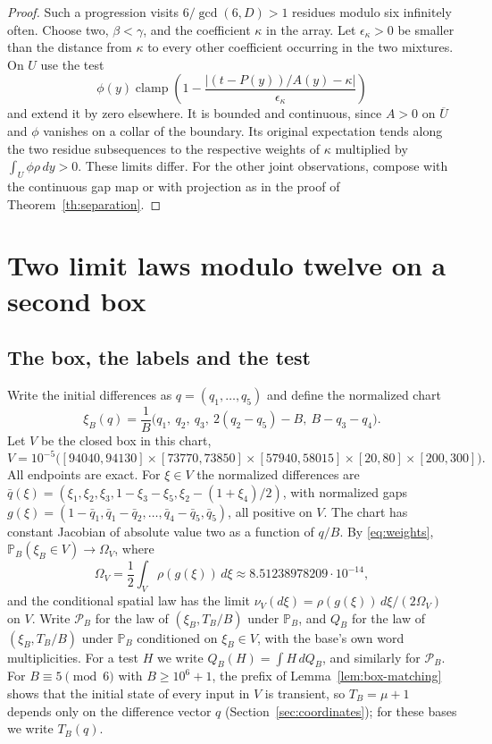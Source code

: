 \documentclass[11pt,reqno]{amsart}
\theoremstyle{remark}
\newcommand{\clamp}{\operatorname{clamp}}
\newcommand{\Prob}{\mathbb P}
\begin{document}
\begin{proof}
Such a progression visits \(6/\gcd(6,D)>1\) residues modulo six infinitely often. Choose two, \(\beta<\gamma\), and the coefficient \(\kappa\) in the array. Let \(\epsilon_\kappa>0\) be smaller than the distance from \(\kappa\) to every other coefficient occurring in the two mixtures. On \(U\) use the test
\[
 \phi(y)\clamp\!\left(1-\frac{|(t-P(y))/A(y)-\kappa|}{\epsilon_\kappa}\right)
\]
and extend it by zero elsewhere. It is bounded and continuous, since \(A>0\) on \(\overline U\) and \(\phi\) vanishes on a collar of the boundary. Its original expectation tends along the two residue subsequences to the respective weights of \(\kappa\) multiplied by \(\int_U\phi\rho\,dy>0\). These limits differ. For the other joint observations, compose with the continuous gap map or with projection as in the proof of Theorem~\ref{th:separation}.
\end{proof}

\section{Two limit laws modulo twelve on a second box}\label{sec:box}

\subsection{The box, the labels and the test}
Write the initial differences as \(q=(q_1,\ldots,q_5)\) and define the normalized chart
\[
 \xi_B(q)=\frac{1}{B}\bigl(q_1,\ q_2,\ q_3,\ 2(q_2-q_5)-B,\ B-q_3-q_4\bigr).
\]
Let \(V\) be the closed box in this chart,
\[
 V=10^{-5}\bigl([94040,94130]\times[73770,73850]\times[57940,58015]
             \times[20,80]\times[200,300]\bigr).
\]
All endpoints are exact. For \(\xi\in V\) the normalized differences are \(\bar q(\xi)=(\xi_1,\xi_2,\xi_3,1-\xi_3-\xi_5,\xi_2-(1+\xi_4)/2)\), with normalized gaps \(g(\xi)=(1-\bar q_1,\bar q_1-\bar q_2,\ldots,\bar q_4-\bar q_5,\bar q_5)\), all positive on \(V\). The chart has constant Jacobian of absolute value two as a function of \(q/B\). By \eqref{eq:weights}, \(\Prob_B(\xi_B\in V)\to\Omega_V\), where
\[
 \Omega_V=\frac12\int_V\rho(g(\xi))\,d\xi\approx8.51238978209\cdot10^{-14},
\]
and the conditional spatial law has the limit \(\nu_V(d\xi)=\rho(g(\xi))\,d\xi/(2\Omega_V)\) on \(V\). Write \(\mathcal P_B\) for the law of \((\xi_B,T_B/B)\) under \(\Prob_B\), and \(Q_B\) for the law of \((\xi_B,T_B/B)\) under \(\Prob_B\) conditioned on \(\xi_B\in V\), with the base's own word multiplicities. For a test \(H\) we write \(Q_B(H)=\int H\,dQ_B\), and similarly for \(\mathcal P_B\). For \(B\equiv5\pmod6\) with \(B\ge10^6+1\), the prefix of Lemma~\ref{lem:box-matching} shows that the initial state of every input in \(V\) is transient, so \(T_B=\mu+1\) depends only on the difference vector \(q\) (Section~\ref{sec:coordinates}); for these bases we write \(T_B(q)\).
\end{document}
